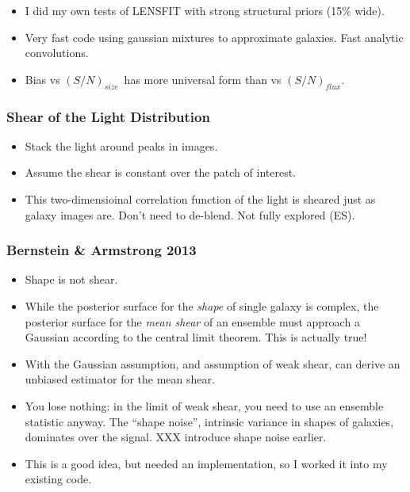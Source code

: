\documentclass{beamer}
\newcommand{\snT}{$(S/N)_{size}$}
\newcommand{\snflux}{$(S/N)_{flux}$}
\begin{document}
{    \begin{itemize}
        \item I did my own tests of LENSFIT with strong structural priors (15\% wide).

        \item Very fast code using gaussian mixtures to approximate galaxies.  Fast
            analytic convolutions.

        \item Bias vs \snT\ has more universal form than vs \snflux.
    \end{itemize}

}

\frame
{
    \frametitle{Shear of the Light Distribution}

    \begin{itemize}

        \item Stack the light around peaks in images.

        \item Assume the shear is constant over the patch of interest.

        \item This two-dimensioinal correlation function of the light is
            sheared just as galaxy images are.  Don't need to de-blend.  Not
            fully explored (ES).

    \end{itemize}
}
\frame
{
    \frametitle{Bernstein \& Armstrong 2013}

    \begin{itemize}

        \item Shape is not shear.
        \item While the posterior surface for the {\it shape} of single galaxy
            is complex, the posterior surface for the {\it mean shear} of an
            ensemble must approach a Gaussian according to the central limit
            theorem.  This is actually true!

         \item With the Gaussian assumption, and assumption of weak
             shear, can derive an unbiased estimator for the mean shear.

         \item You lose nothing: in the limit of weak shear, you need
             to use an ensemble statistic anyway.  The ``shape noise'',
             intrinsic variance in shapes of galaxies, dominates over
             the signal. XXX introduce shape noise earlier.

        \item This is a good idea, but needed an implementation, so I worked it
            into my existing code.
         
    \end{itemize}

}
\end{document}
